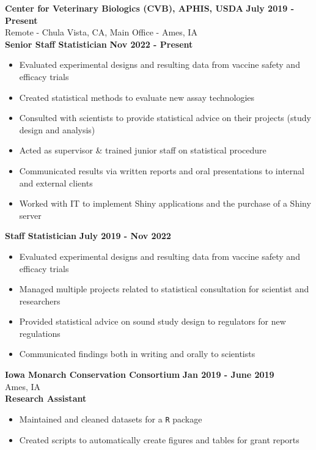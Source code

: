 \documentclass{article}
\newenvironment{innerlist}[1][\enskip\textbullet]%
        {\begin{itemize}[#1,leftmargin=*,parsep=0pt,itemsep=0pt,topsep=0pt,partopsep=0pt]}
        {\end{itemize}}
\begin{document}
\textbf{Center for Veterinary Biologics (CVB), APHIS, USDA}  \hfill {\textbf{July 2019 - Present}}\\
Remote - Chula Vista, CA, Main Office - Ames, IA\\
\textbf{Senior Staff Statistician} \hfill {\textbf{Nov 2022 - Present}}
\begin{innerlist}
  \item Evaluated experimental designs and resulting data from vaccine safety and efficacy trials
  \item Created statistical methods to evaluate new assay technologies
  \item Consulted with scientists to provide statistical advice on their projects (study design and analysis)
  \item Acted as supervisor \& trained junior staff on statistical procedure
  \item Communicated results via written reports and oral presentations to internal and external clients
  \item Worked with IT to implement Shiny applications and the purchase of a Shiny server \\
\end{innerlist}

\textbf{Staff Statistician} \hfill {\textbf{July 2019 - Nov 2022}}
\begin{innerlist}
  \item Evaluated experimental designs and resulting data from vaccine safety and efficacy trials
  \item Managed multiple projects related to statistical consultation for scientist and researchers
  \item Provided statistical advice on sound study design to regulators for new regulations 
  \item Communicated findings both in writing and orally to scientists\\
\end{innerlist}

\textbf{Iowa Monarch Conservation Consortium} \hfill {\textbf{Jan 2019 - June 2019}} \\
Ames, IA\\
\textbf{Research Assistant}
\begin{innerlist}
  \item Maintained and cleaned datasets for a \verb|R| package
  \item Created scripts to automatically create figures and tables for grant reports \\
\end{innerlist}
\end{document}
